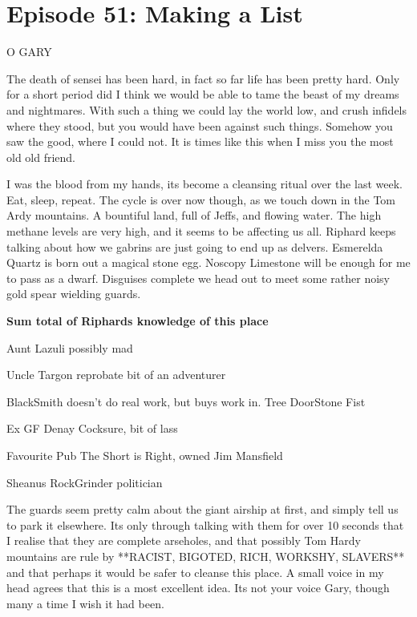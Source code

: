 \section{Episode 51: Making a List}

\medskip

O GARY\medskip

The death of sensei has been hard, in fact so far life has been pretty hard. Only for a short period did I think we would be able to tame the beast of my dreams and nightmares. With such a thing we could lay the world low, and crush infidels where they stood, but you would have been against such things. Somehow you saw the good, where I could not. It is times like this when I miss you the most old old friend.\medskip

I was the blood from my hands, its become a cleansing ritual over the last week. Eat, sleep, repeat. The cycle is over now though, as we touch down in the Tom Ardy mountains. A bountiful land, full of Jeffs, and flowing water. The high methane levels are very high, and it seems to be affecting us all. Riphard keeps talking about how we gabrins are just going to end up as delvers. Esmerelda Quartz is born out a magical stone egg. Noscopy Limestone will be enough for me to pass as a dwarf. Disguises complete we head out to meet some rather noisy gold spear wielding guards.\medskip

\textbf{Sum total of Riphards knowledge of this place} \medskip

    Aunt Lazuli possibly mad

    Uncle Targon reprobate bit of an adventurer

    BlackSmith doesn't do real work, but buys work in. Tree DoorStone Fist

    Ex GF Denay Cocksure, bit of lass

    Favourite Pub The Short is Right, owned Jim Mansfield

    Sheanus RockGrinder politician\medskip

The guards seem pretty calm about the giant airship at first, and simply tell us to park it elsewhere. Its only through talking with them for over 10 seconds that I realise that they are complete arseholes, and that possibly Tom Hardy mountains are rule by **RACIST, BIGOTED, RICH, WORKSHY, SLAVERS** and that perhaps it would be safer to cleanse this place. A small voice in my head agrees that this is a most excellent idea. Its not your voice Gary, though many a time I wish it had been.\medskip

